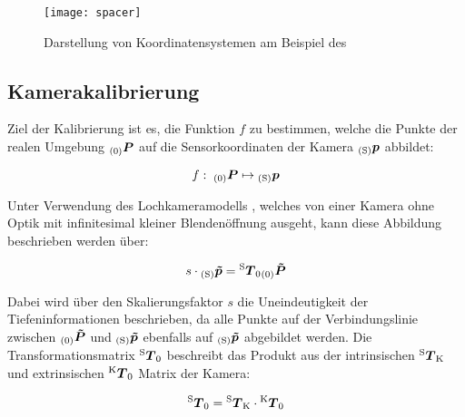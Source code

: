 \begin{figure}[ht]
	\begin{center}
		\texttt{[image: spacer]}
		\caption{Darstellung von Koordinatensystemen am Beispiel des }
		\label{fig.coords}
	\end{center}
\end{figure}

\subsection{Kamerakalibrierung}
Ziel der Kalibrierung ist es, die Funktion $f$ zu bestimmen, welche die Punkte der realen Umgebung ${_{{\mathrm{(0)}}}}\mbox{\boldmath{$P$}}$ auf die Sensorkoordinaten der Kamera ${_{{\mathrm{(S)}}}}\mbox{\boldmath{$p$}}$ abbildet:

\begin{equation}
f : \; {_{{\mathrm{(0)}}}}\mbox{\boldmath{$P$}} \mapsto {_{{\mathrm{(S)}}}}\mbox{\boldmath{$p$}}
\end{equation}

Unter Verwendung des Lochkameramodells , welches von einer Kamera ohne Optik mit infinitesimal kleiner Blendenöffnung ausgeht, kann diese Abbildung beschrieben werden über:

\begin{equation}
s \cdot {_{{\mathrm{(S)}}}}\mbox{\boldmath{$\tilde{p}$}} = {^{\mathrm{S}}\mbox{\boldmath{$T$}}_{\mathrm{0}}}{_{{\mathrm{(0)}}}}\mbox{\boldmath{$\tilde{P}$}}
\label{eq.persp_abb}
\end{equation}

Dabei wird über den Skalierungsfaktor $s$ die Uneindeutigkeit der Tiefeninformationen beschrieben, da alle Punkte auf der Verbindungslinie zwischen ${_{{\mathrm{(0)}}}}\mbox{\boldmath{$\tilde{P}$}}$ und ${_{{\mathrm{(S)}}}}\mbox{\boldmath{$\tilde{p}$}}$ ebenfalls auf ${_{{\mathrm{(S)}}}}\mbox{\boldmath{$\tilde{p}$}}$ abgebildet werden. 
Die Transformationsmatrix ${^{\mathrm{S}}\mbox{\boldmath{$T$}}_{\mathrm{0}}}$ beschreibt das Produkt aus der intrinsischen ${^{\mathrm{S}}\mbox{\boldmath{$T$}}_{\mathrm{K}}}$ und extrinsischen ${^{\mathrm{K}}\mbox{\boldmath{$T$}}_{\mathrm{0}}}$ Matrix der Kamera:

\begin{equation}
{^{\mathrm{S}}\mbox{\boldmath{$T$}}_{\mathrm{0}}} = {^{\mathrm{S}}\mbox{\boldmath{$T$}}_{\mathrm{K}}} \cdot {^{\mathrm{K}}\mbox{\boldmath{$T$}}_{\mathrm{0}}}
\end{equation}


